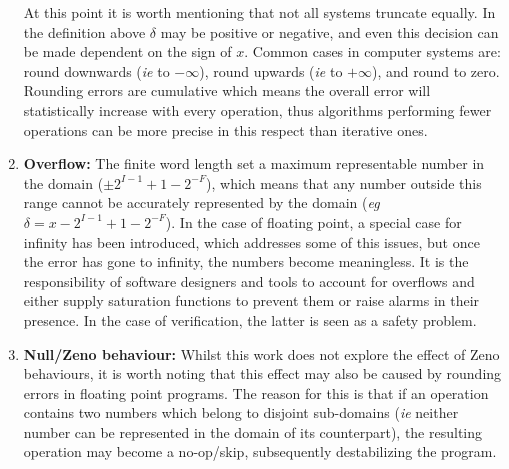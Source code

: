 \documentclass[runningheads,a4paper]{llncs}
\begin{document}
\begin{enumerate}
At this point it is worth mentioning that not all systems truncate equally. In the definition above $\delta$ may be positive
or negative, and even this decision can be made dependent on the sign of $x$. Common cases in computer systems are:
round downwards (\emph{ie} to $-\infty$), round upwards (\emph{ie} to $+\infty$), and round to zero.
Rounding errors are cumulative which means the overall error will statistically increase with every operation, thus algorithms
performing fewer operations can be more precise in this respect than iterative ones. 
\item {\bf Overflow:}
  The finite word length set a
maximum representable number in the domain ($\pm 2^{I-1}+1-2^{-F}$), which means that any number outside this range
cannot be accurately represented by the domain (\emph{eg} $\delta=x-2^{I-1}+1-2^{-F}$). In the case of floating point, a special
case for infinity has been introduced, which addresses some of this issues, but once the error has gone to infinity, the numbers
become meaningless. It is the responsibility of software designers and tools to account for overflows and either supply saturation
functions to prevent them or raise alarms in their presence. In the case of verification, the latter is seen as a safety problem.
\item {\bf Null/Zeno behaviour:}
Whilst this work does not explore the effect of Zeno behaviours, it is worth noting that this effect may also be caused by rounding
errors in floating point programs. The reason for this is that if an operation contains two numbers which belong to disjoint sub-domains
(\emph{ie} neither number can be represented in the domain of its counterpart), the resulting operation may become a no-op/skip,
subsequently destabilizing the program.
\end{enumerate}

\end{document}

